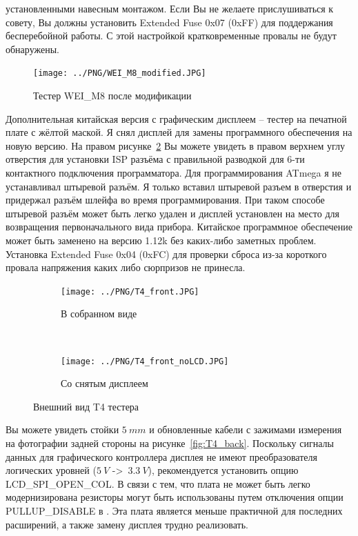 установленными навесным монтажом.
Если Вы не желаете прислушиваться к совету, Вы должны установить Extended Fuse 0x07 (0xFF)
для поддержания бесперебойной работы. С этой настройкой кратковременные провалы не будут обнаружены.
\begin{figure}[H]
\centering
\texttt{[image: ../PNG/WEI\_M8\_modified.JPG]}
\caption{Тестер WEI\_M8 после модификации}
\label{fig:WeiM8mod}
\end{figure}
Дополнительная китайская версия с графическим дисплеем -- тестер  
на печатной плате с жёлтой маской.
Я снял дисплей для замены программного обеспечения на новую версию.
На правом рисунке~\ref{fig:T4_front} Вы можете увидеть в правом верхнем углу отверстия для установки 
ISP разъёма с правильной разводкой для 6-ти контактного подключения программатора.
Для программирования ATmega я не устанавливал штыревой разъём. Я только вставил штыревой разъем  
в отверстия и придержал разъём шлейфа во время программирования.
При таком способе штыревой разъём может быть легко удален и дисплей установлен на место для 
возвращения первоначального вида прибора.
Китайское программное обеспечение может быть заменено на версию 1.12k без каких-либо заметных проблем.
Установка Extended Fuse 0x04 (0xFC) для проверки сброса из-за короткого провала напряжения 
каких либо сюрпризов не принесла.
\begin{figure}[H]
  \begin{subfigure}[b]{.5\textwidth}
    \centering
    \texttt{[image: ../PNG/T4\_front.JPG]}
    \caption{В собранном виде}
  \end{subfigure}
  ~
  \begin{subfigure}[b]{.5\textwidth}
    \centering
    \texttt{[image: ../PNG/T4\_front\_noLCD.JPG]}
    \caption{Со снятым дисплеем}
  \end{subfigure}
  \caption{Внешний вид T4 тестера}
  \label{fig:T4_front}
\end{figure}
Вы можете увидеть стойки \(5~mm\) и обновленные кабели с зажимами измерения на 
фотографии задней стороны на рисунке~\ref{fig:T4_back}.
Поскольку сигналы данных для графического контроллера дисплея не имеют преобразователя
логических уровней (\(5~V\) -\textgreater \ \(3.3~V\)), рекомендуется установить опцию LCD\_SPI\_OPEN\_COL.
В связи с тем, что плата не может быть легко модернизирована  резисторы могут быть
использованы путем отключения опции PULLUP\_DISABLE в .
Эта плата является меньше практичной для последних расширений, а также замену дисплея 
трудно реализовать.

